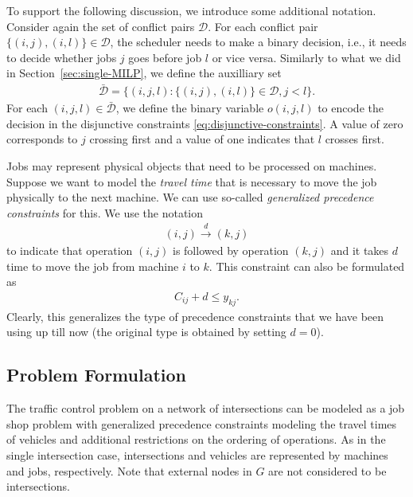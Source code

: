 \documentclass{article}
\theoremstyle{definition}
\theoremstyle{plain}
\begin{document}
To support the following discussion, we introduce some additional notation.
Consider again the set of conflict pairs $\mathcal{D}$. For each conflict pair
$\{ (i,j), (i,l) \} \in \mathcal{D}$, the scheduler needs to make a binary
decision, i.e., it needs to decide whether jobs $j$ goes before job $l$ or vice
versa. Similarly to what we did in Section~\ref{sec:single-MILP}, we define the
auxilliary set
\begin{align}
  \bar{\mathcal{D}} = \{ (i,j,l) : \{ (i,j), (i,l) \} \in \mathcal{D}, j < l \} .
\end{align}
For each $(i,j,l) \in \bar{\mathcal{D}}$, we define the binary variable
$o(i,j,l)$ to encode the decision in the disjunctive constraints
\eqref{eq:disjunctive-constraints}. A value of zero corresponds to $j$ crossing
first and a value of one indicates that $l$ crosses first.

Jobs may represent physical objects that need to be processed on machines.
Suppose we want to model the \textit{travel time} that is necessary to move the
job physically to the next machine. We can use so-called \textit{generalized
  precedence constraints} for this. We use the notation
\begin{align*}
  (i,j) \xrightarrow{d} (k,j)
\end{align*}
to indicate that operation $(i,j)$ is followed by operation $(k,j)$ and it takes
$d$ time to move the job from machine $i$ to $k$. This constraint can also be
formulated as
\begin{align}
  C_{ij} + d \leq y_{kj} .
\end{align}
Clearly, this generalizes the type of precedence constraints that we have been
using up till now (the original type is obtained by setting $d=0$).

\subsection{Problem Formulation}

The traffic control problem on a network of intersections can be modeled as a
job shop problem with generalized precedence constraints modeling the travel
times of vehicles and additional restrictions on the ordering of operations. As
in the single intersection case, intersections and vehicles are represented by
machines and jobs, respectively. Note that external nodes in $G$ are not
considered to be intersections.
\end{document}
